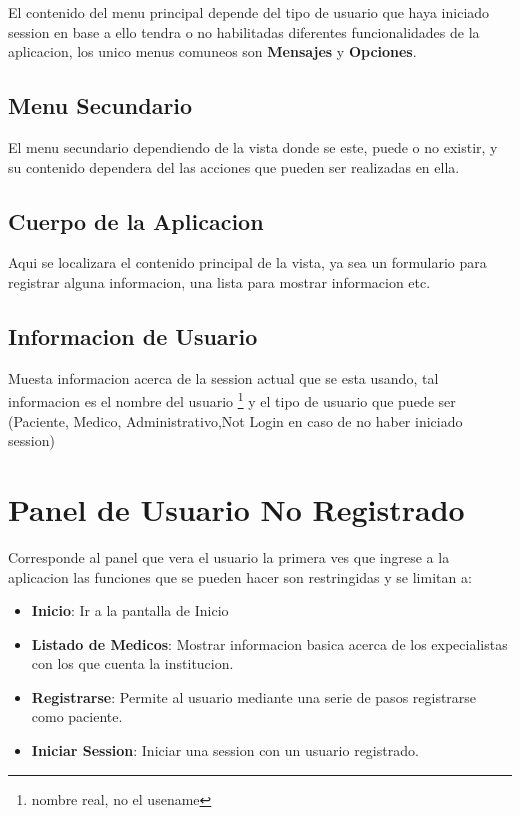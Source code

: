 El contenido del menu principal depende del tipo de usuario que haya iniciado session
en base a ello tendra o no habilitadas diferentes funcionalidades de la aplicacion,
los unico menus comuneos son \textbf{Mensajes} y \textbf{Opciones}.


\subsection{Menu Secundario}

El menu secundario dependiendo de la vista donde se este, puede o no existir, y
su contenido dependera del las acciones que pueden ser realizadas en ella.


\subsection{Cuerpo de la Aplicacion}

Aqui se localizara el contenido principal de la vista, ya sea un formulario para
registrar alguna informacion, una lista para mostrar informacion etc.


\subsection{Informacion de Usuario}

Muesta informacion acerca de la session actual que se esta usando, tal informacion
es el nombre del usuario \footnote{nombre real, no el usename} y el tipo de usuario
que puede ser (Paciente, Medico, Administrativo,Not Login en caso de no haber
iniciado session)


\section{Panel de Usuario No Registrado}

Corresponde al panel que vera el usuario la primera ves que ingrese a la aplicacion
las funciones que se pueden hacer son restringidas y se limitan a:

\begin{itemize}
    \item \textbf{Inicio}: Ir a la pantalla de Inicio
    \item \textbf{Listado de Medicos}: Mostrar informacion basica acerca de los expecialistas
        con los que cuenta la institucion.
    \item \textbf{Registrarse}: Permite al usuario mediante una serie de pasos registrarse como paciente.
    \item \textbf{Iniciar Session}: Iniciar una session con un usuario registrado.
\end{itemize}

